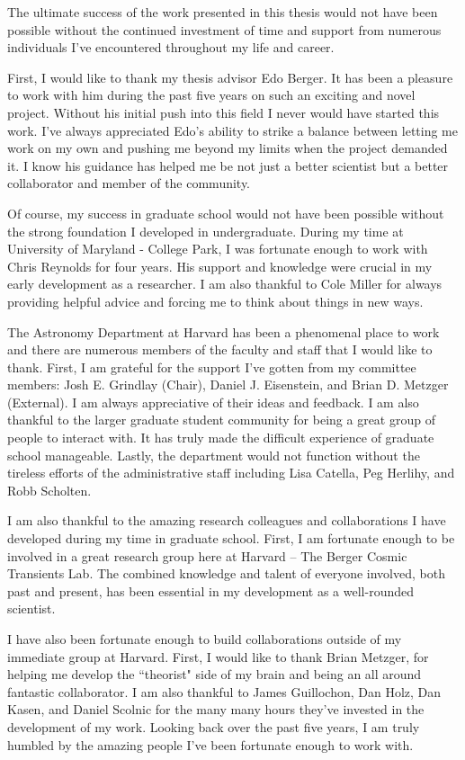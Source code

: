 The ultimate success of the work presented in this thesis would not have been possible without the continued investment of time and support from numerous individuals I've encountered throughout my life and career.

First, I would like to thank my thesis advisor Edo Berger. It has been a pleasure to work with him during the past five years on such an exciting and novel project. Without his initial push into this field I never would have started this work. I've always appreciated Edo's ability to strike a balance between letting me work on my own and pushing me beyond my limits when the project demanded it. I know his guidance has helped me be not just a better scientist but a better collaborator and member of the community.

Of course, my success in graduate school would not have been possible without the strong foundation I developed in undergraduate. During my time at University of Maryland - College Park, I was fortunate enough to work with Chris Reynolds for four years. His support and knowledge were crucial in my early development as a researcher. I am also thankful to Cole Miller for always providing helpful advice and forcing me to think about things in new ways.

The Astronomy Department at Harvard has been a phenomenal place to work and there are numerous members of the faculty and staff that I would like to thank. First, I am grateful for the support I've gotten from my committee members: Josh E. Grindlay (Chair), Daniel J. Eisenstein, and Brian D. Metzger (External). I am always appreciative of their ideas and feedback. I am also thankful to the larger graduate student community for being a great group of people to interact with. It has truly made the difficult experience of graduate school manageable. Lastly, the department would not function without the tireless efforts of the administrative staff including Lisa Catella, Peg Herlihy, and Robb Scholten.

I am also thankful to the amazing research colleagues and collaborations I have developed during my time in graduate school. First, I am fortunate enough to be involved in a great research group here at Harvard -- The Berger Cosmic Transients Lab. The combined knowledge and talent of everyone involved, both past and present, has been essential in my development as a well-rounded scientist.

I have also been fortunate enough to build collaborations outside of my immediate group at Harvard. First, I would like to thank Brian Metzger, for helping me develop the ``theorist" side of my brain and being an all around fantastic collaborator. I am also thankful to James Guillochon, Dan Holz, Dan Kasen, and Daniel Scolnic for the many many hours they've invested in the development of my work. Looking back over the past five years, I am truly humbled by the amazing people I've been fortunate enough to work with.

